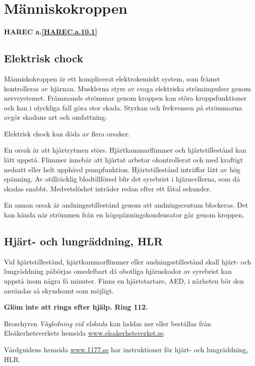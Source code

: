 \section{Människokroppen}
\textbf{
HAREC a.\ref{HAREC.a.10.1}\label{myHAREC.a.10.1}
}

\subsection{Elektrisk chock}

Människokroppen är ett komplicerat elektrokemiskt system, som främst
kontrolleras av hjärnan. Musklerna styrs av svaga elektriska
strömimpulser genom nervsystemet. Främmande strömmar genom kroppen kan
störa kroppsfunktioner och kan i olyckliga fall göra stor
skada. Styrkan och frekvensen på strömmarna avgör skadans art och
omfattning.

Elektrisk chock kan döda av flera orsaker.

En orsak är att hjärtrytmen störs. Hjärtkammarflimmer och
hjärtstillestånd kan lätt uppstå. Flimmer innebär att hjärtat arbetar
okontrollerat och med kraftigt nedsatt eller helt upphävd
pumpfunktion. Hjärtstillestånd inträffar lätt av hög spänning. Av
otillräcklig blodtillförsel blir det syrebrist i hjärncellerna, som då
skadas snabbt. Medvetslöshet inträder redan efter ett fåtal sekunder.

En annan orsak är andningsstillestånd genom att andningscentum
blockeras. Det kan hända när strömmen från en högspänningskondensator
går genom kroppen.

\subsection{Hjärt- och lungräddning, HLR}

Vid hjärtstillestånd, hjärtkammarflimmer eller andningsstillestånd skall
hjärt- och lungräddning påbörjas omedelbart då obotliga hjärnskador av
syrebrist kan uppstå inom några få minuter. Finns en hjärtstartare,
AED, i närheten bör den användas så skyndsamt som möjligt.

\textbf{Glöm inte att ringa efter hjälp. Ring 112.}

Broschyren \emph{Vägledning vid elskada} kan laddas ner eller beställas från
Elsäkerhetsverkets hemsida \url{www.elsakerhetsverket.se}.

Vårdguidens hemsida \url{www.1177.se} har instruktioner för hjärt- och lungräddning, HLR.

